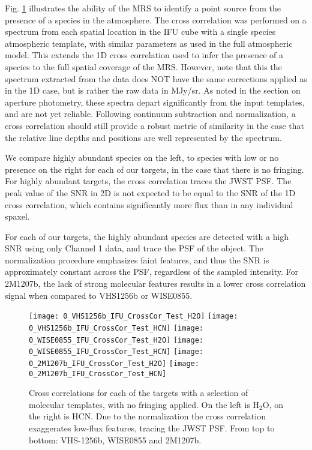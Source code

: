 Fig. \ref{fig:2dccmap} illustrates the ability of the MRS to identify a point source from the presence of a species in the atmosphere.
The cross correlation was performed on a spectrum from each spatial location in the IFU cube with a single species atmospheric template, with similar parameters as used in the full atmospheric model.
This extends the 1D cross correlation used to infer the presence of a species to the full spatial coverage of the MRS.
However, note that this the spectrum extracted from the data does NOT have the same corrections applied as in the 1D case, but is rather the raw data in MJy/sr.
As noted in the section on aperture photometry, these spectra depart significantly from the input templates, and are not yet reliable.
Following continuum subtraction and normalization, a cross correlation should still provide a robust metric of similarity in the case that the relative line depths and positions are well represented by the spectrum.

We compare highly abundant species on the left, to species with low or no presence on the right for each of our targets, in the case that there is no fringing.
For highly abundant targets, the cross correlation traces the JWST PSF.
The peak value of the SNR in 2D is not expected to be equal to the SNR of the 1D cross correlation, which contains significantly more flux than in any individual spaxel.

For each of our targets, the highly abundant species are detected with a high SNR using only Channel 1 data, and trace the PSF of the object.
The normalization procedure emphasizes faint features, and thus the SNR is approximately constant across the PSF, regardless of the sampled intensity.
For 2M1207b, the lack of strong molecular features results in a lower cross correlation signal when compared to VHS1256b or WISE0855.
\begin{figure}[t]
	\centering
	\texttt{[image: 0\_VHS1256b\_IFU\_CrossCor\_Test\_H2O]}
	\texttt{[image: 0\_VHS1256b\_IFU\_CrossCor\_Test\_HCN]}
	\texttt{[image: 0\_WISE0855\_IFU\_CrossCor\_Test\_H2O]}
	\texttt{[image: 0\_WISE0855\_IFU\_CrossCor\_Test\_HCN]}
	\texttt{[image: 0\_2M1207b\_IFU\_CrossCor\_Test\_H2O]}
	\texttt{[image: 0\_2M1207b\_IFU\_CrossCor\_Test\_HCN]}
	\caption{Cross correlations for each of the targets with a selection of molecular templates, with no fringing applied. On the left is H$_{2}$O, on the right is HCN.  Due to the normalization the cross correlation exaggerates low-flux features, tracing the JWST PSF. From top to bottom: VHS-1256b, WISE0855 and 2M1207b.}
	\label{fig:2dccmap}
\end{figure}
